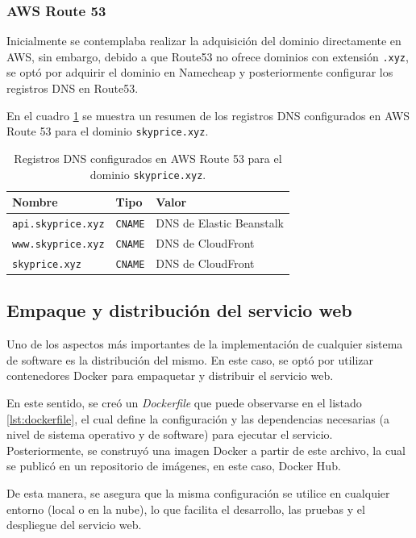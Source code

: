 \subsubsection{AWS Route 53}
Inicialmente se contemplaba realizar la adquisición del dominio directamente
en AWS, sin embargo, debido a que Route53 no ofrece dominios con extensión
\texttt{.xyz}, se optó por adquirir el dominio en Namecheap y posteriormente
configurar los registros DNS en Route53.

En el cuadro \ref{tab:registros-dns} se muestra un resumen de los registros DNS
configurados en AWS Route 53 para el dominio \texttt{skyprice.xyz}.

\begin{table}[H]
    \centering
    \begin{tabular}{|p{}|p{}|p{}|}
    \hline
    \rowcolor{azulclaro}
      \textbf{Nombre} & \textbf{Tipo} & \textbf{Valor} \\ \hline
      \texttt{api.skyprice.xyz} & \texttt{CNAME} & DNS de Elastic Beanstalk \\ \hline
      \texttt{www.skyprice.xyz} & \texttt{CNAME} & DNS de CloudFront \\ \hline
      \texttt{skyprice.xyz} & \texttt{CNAME} & DNS de CloudFront \\ \hline
    \end{tabular}
    \caption{Registros DNS configurados en AWS Route 53 para el dominio \texttt{skyprice.xyz}.}
    \label{tab:registros-dns}
\end{table}

\subsection{Empaque y distribución del servicio web}

Uno de los aspectos más importantes de la implementación de cualquier sistema de software es la distribución del mismo. En este caso, se optó por utilizar contenedores Docker para empaquetar y distribuir el servicio web.

En este sentido, se creó un \textit{Dockerfile} que puede observarse en el listado \ref{lst:dockerfile}, el cual define la configuración y las dependencias necesarias (a nivel de sistema operativo y de software) para ejecutar el servicio. Posteriormente, se construyó una imagen Docker a partir de este archivo, la cual se publicó en un repositorio de imágenes, en este caso, Docker Hub.

De esta manera, se asegura que la misma configuración se utilice en cualquier entorno (local o en la nube), lo que facilita el desarrollo, las pruebas y el despliegue del servicio web.

